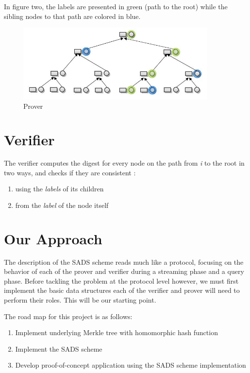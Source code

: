 \documentclass[11pt, letterpaper, oneside]{article}
\begin{document}
	In figure two, the labels are presented in green (path to the root) while the sibling nodes to that path are colored in blue. 

	\begin{figure}[h]
        \centering
        \includegraphics[width=100mm]{./images/8.jpg}
        \caption[]{Prover}
        \end{figure}
	
	
	\section{Verifier}
	
	The verifier computes the digest for every node on the path from \textit{i} to the root in two ways, and checks if they are consistent :
	
	\begin{enumerate}
	 \item using the \textit{labels} of its children
	 \item from the \textit{label} of the node itself
	\end{enumerate}


	\section{Our Approach}
	
	The description of the SADS scheme reads much like a protocol, focusing on the behavior of each of the prover and verifier during a streaming phase and a query phase.
	Before tackling the problem at the protocol level however, we must first implement the basic data structures each of the verifier and prover will need to perform their roles.
	This will be our starting point.

	The road map for this project is as follows:
	\begin{enumerate}
	\item Implement underlying Merkle tree with homomorphic hash function
	\item Implement the SADS scheme
	\item Develop proof-of-concept application using the SADS scheme implementation
	\end{enumerate}
\end{document}
